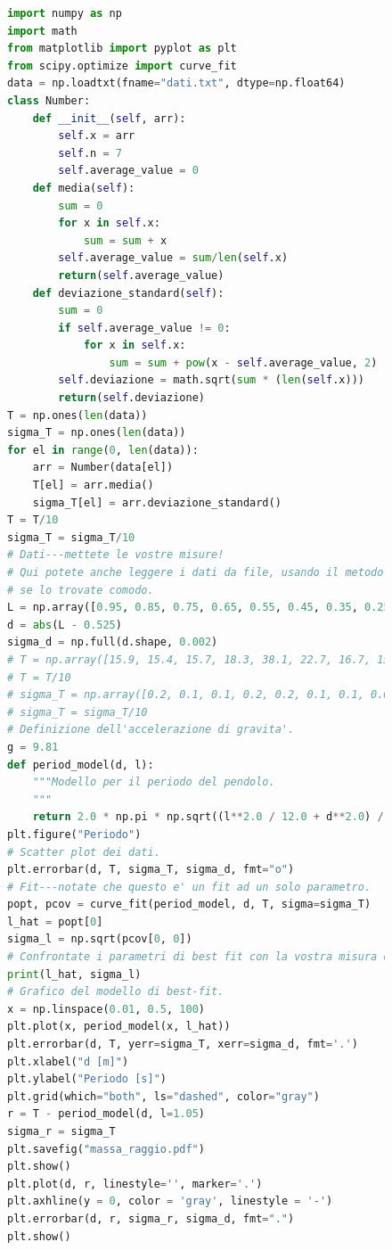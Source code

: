 \documentclass{article}
\begin{document}
\newpage
\begin{figure}[hptb]
	\begin{lstlisting}[language=Python]
import numpy as np
import math
from matplotlib import pyplot as plt 
from scipy.optimize import curve_fit
data = np.loadtxt(fname="dati.txt", dtype=np.float64)
class Number:
    def __init__(self, arr):
        self.x = arr
        self.n = 7
        self.average_value = 0
    def media(self):
        sum = 0
        for x in self.x:
            sum = sum + x
        self.average_value = sum/len(self.x)
        return(self.average_value)
    def deviazione_standard(self):
        sum = 0
        if self.average_value != 0:
            for x in self.x:
                sum = sum + pow(x - self.average_value, 2)
        self.deviazione = math.sqrt(sum * (len(self.x)))
        return(self.deviazione)
T = np.ones(len(data))
sigma_T = np.ones(len(data))
for el in range(0, len(data)):
    arr = Number(data[el])
    T[el] = arr.media()
    sigma_T[el] = arr.deviazione_standard()
T = T/10
sigma_T = sigma_T/10
# Dati---mettete le vostre misure! 
# Qui potete anche leggere i dati da file, usando il metodo np.loadtxt(), 
# se lo trovate comodo. 
L = np.array([0.95, 0.85, 0.75, 0.65, 0.55, 0.45, 0.35, 0.25, 0.15, 0.05])
d = abs(L - 0.525)
sigma_d = np.full(d.shape, 0.002) 
# T = np.array([15.9, 15.4, 15.7, 18.3, 38.1, 22.7, 16.7, 15.61, 15.7, 16.3])
# T = T/10 
# sigma_T = np.array([0.2, 0.1, 0.1, 0.2, 0.2, 0.1, 0.1, 0.06, 0.1, 0.1])
# sigma_T = sigma_T/10 
# Definizione dell'accelerazione di gravita'. 
g = 9.81 
def period_model(d, l): 
    """Modello per il periodo del pendolo. 
    """ 
    return 2.0 * np.pi * np.sqrt((l**2.0 / 12.0 + d**2.0) / (g * d)) 
plt.figure("Periodo")
# Scatter plot dei dati. 
plt.errorbar(d, T, sigma_T, sigma_d, fmt="o") 
# Fit---notate che questo e' un fit ad un solo parametro. 
popt, pcov = curve_fit(period_model, d, T, sigma=sigma_T) 
l_hat = popt[0] 
sigma_l = np.sqrt(pcov[0, 0]) 
# Confrontate i parametri di best fit con la vostra misura diretta! 
print(l_hat, sigma_l) 
# Grafico del modello di best-fit. 
x = np.linspace(0.01, 0.5, 100) 
plt.plot(x, period_model(x, l_hat))
plt.errorbar(d, T, yerr=sigma_T, xerr=sigma_d, fmt='.') 
plt.xlabel("d [m]") 
plt.ylabel("Periodo [s]")
plt.grid(which="both", ls="dashed", color="gray")
r = T - period_model(d, l=1.05)
sigma_r = sigma_T
plt.savefig("massa_raggio.pdf") 
plt.show()
plt.plot(d, r, linestyle='', marker='.')
plt.axhline(y = 0, color = 'gray', linestyle = '-') 
plt.errorbar(d, r, sigma_r, sigma_d, fmt=".")
plt.show()
	\end{lstlisting}
\end{figure}
\end{document}
